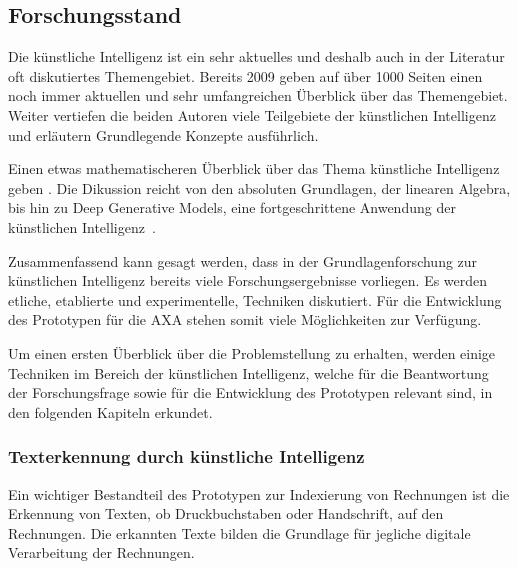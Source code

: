 \documentclass{hwz}
\begin{document}
\subsection{Forschungsstand}



Die künstliche Intelligenz ist ein sehr aktuelles und deshalb auch in der Literatur oft diskutiertes Themengebiet. Bereits 2009 geben \textcite{Russell2009ArtificialEdition} auf über 1000 Seiten einen noch immer aktuellen und sehr umfangreichen Überblick über das Themengebiet. Weiter vertiefen die beiden Autoren viele Teilgebiete der künstlichen Intelligenz und erläutern Grundlegende Konzepte ausführlich.

Einen etwas mathematischeren Überblick über das Thema künstliche Intelligenz geben \textcite{Goodfellow2016DeepLearning}. Die Dikussion reicht von den absoluten Grundlagen, der linearen Algebra, bis hin zu Deep Generative Models, eine fortgeschrittene Anwendung der künstlichen Intelligenz~\autocite{Goodfellow2016DeepLearning}.

Zusammenfassend kann gesagt werden, dass in der Grundlagenforschung zur künstlichen Intelligenz bereits viele Forschungsergebnisse vorliegen. Es werden etliche, etablierte und experimentelle, Techniken diskutiert. Für die Entwicklung des Prototypen für die AXA stehen somit viele Möglichkeiten zur Verfügung.

Um einen ersten Überblick über die Problemstellung zu erhalten, werden einige Techniken im Bereich der künstlichen Intelligenz, welche für die Beantwortung der Forschungsfrage sowie für die Entwicklung des Prototypen relevant sind, in den folgenden Kapiteln erkundet. 

\subsubsection{Texterkennung durch künstliche Intelligenz}

Ein wichtiger Bestandteil des Prototypen zur Indexierung von Rechnungen ist die Erkennung von Texten, ob Druckbuchstaben oder Handschrift, auf den Rechnungen. Die erkannten Texte bilden die Grundlage für jegliche digitale Verarbeitung der Rechnungen.
\end{document}
